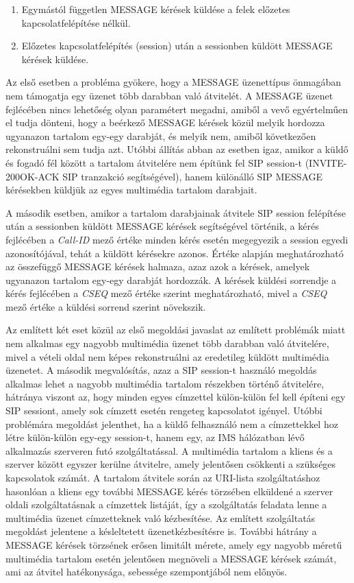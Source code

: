 \begin{enumerate}\itemsep1pt
\item	Egymástól független MESSAGE kérések küldése a felek előzetes kapcsolatfelépítése nélkül.
\item Előzetes kapcsolatfelépítés (session) után a sessionben küldött MESSAGE kérések küldése. 
\end{enumerate}

Az első esetben a probléma gyökere, hogy a MESSAGE üzenettípus önmagában nem támogatja egy üzenet több darabban való átvitelét. A MESSAGE üzenet fejlécében nincs lehetőség olyan paramétert megadni, amiből a vevő egyértelműen el tudja dönteni, hogy a beérkező MESSAGE kérések közül melyik hordozza ugyanazon tartalom egy-egy darabját, és melyik nem, amiből következően rekonstruálni sem tudja azt. Utóbbi állítás abban az esetben igaz, amikor a küldő és fogadó fél között a tartalom átvitelére nem építünk fel SIP session-t (INVITE-200OK-ACK SIP tranzakció segítségével), hanem különálló SIP MESSAGE kérésekben küldjük az egyes multimédia tartalom darabjait. 

A második esetben, amikor a tartalom darabjainak átvitele SIP session felépítése után a sessionben küldött MESSAGE kérések segítségével történik, a kérés fejlécében a \emph{Call-ID} mező értéke minden kérés esetén megegyezik a session egyedi azonosítójával, tehát a küldött kérésekre azonos. Értéke alapján meghatározható az összefüggő MESSAGE kérések halmaza, azaz azok a kérések, amelyek ugyanazon tartalom egy-egy darabját hordozzák. A kérések küldési sorrendje a kérés fejlécében a \emph{CSEQ} mező értéke szerint meghatározható, mivel a \emph{CSEQ} mező értéke a küldési sorrend szerint növekszik. 

Az említett két eset közül az első megoldási javaslat az említett problémák miatt nem alkalmas egy nagyobb multimédia üzenet több darabban való átvitelére, mivel a vételi oldal nem képes rekonstruálni az eredetileg küldött multimédia üzenetet. A második megvalósítás, azaz a SIP session-t használó megoldás alkalmas lehet a nagyobb multimédia tartalom részekben történő átvitelére, hátránya viszont az, hogy minden egyes címzettel külön-külön fel kell építeni egy SIP sessiont, amely sok címzett esetén rengeteg kapcsolatot igényel. Utóbbi problémára megoldást jelenthet, ha a küldő felhasználó nem a címzettekkel hoz létre külön-külön egy-egy session-t, hanem egy, az IMS hálózatban lévő alkalmazás szerveren futó szolgáltatással. A multimédia tartalom a kliens és a szerver között egyszer kerülne átvitelre, amely jelentősen csökkenti a szükséges kapcsolatok számát. A tartalom átvitele során az URI-lista szolgáltatáshoz hasonlóan a kliens egy további MESSAGE kérés törzsében elküldené a szerver oldali szolgáltatásnak a címzettek listáját, így a szolgáltatás feladata lenne a multimédia üzenet címzetteknek való kézbesítése. Az említett szolgáltatás megoldást jelentene a késleltetett üzenetkézbesítésre is. További hátrány a MESSAGE kérések törzsének erősen limitált mérete, amely egy nagyobb méretű multimédia tartalom esetén jelentősen megnöveli a MESSAGE kérések számát, ami az átvitel hatékonysága, sebessége szempontjából nem előnyös.

